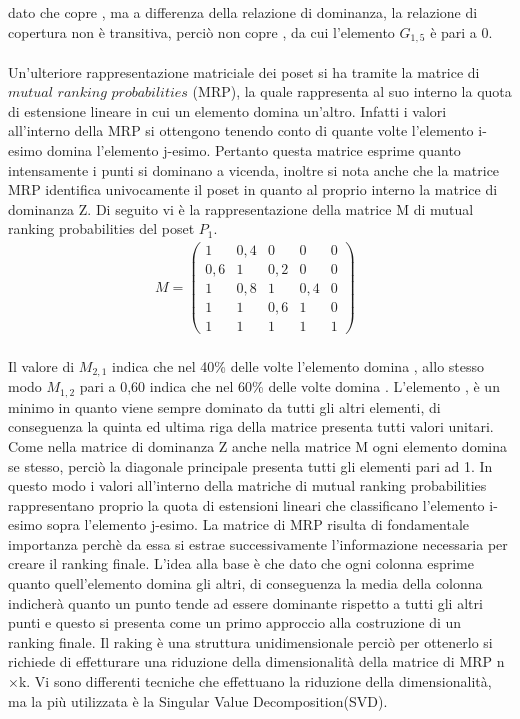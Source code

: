 \documentclass[12pt]{article}
\begin{document}
dato che  copre , ma a differenza della relazione di dominanza, la relazione di copertura non è transitiva, 
perciò  non copre , da cui l'elemento $G_{1,5}$ è pari a 0. \\
\\
Un'ulteriore rappresentazione matriciale dei poset si ha tramite la matrice di $\textit{mutual ranking probabilities}$
(MRP), la quale 
rappresenta al suo interno la quota di estensione lineare in cui un elemento domina un'altro. Infatti i valori all'interno della MRP si ottengono tenendo conto di quante volte l'elemento i-esimo 
domina l'elemento j-esimo. Pertanto
questa matrice esprime quanto intensamente i punti si dominano a vicenda, inoltre si nota anche che la matrice 
MRP identifica univocamente il poset in quanto  al proprio interno la matrice di dominanza 
Z. Di seguito vi è la rappresentazione della matrice M di mutual ranking probabilities
del poset $P_{1}$. 
\begin{align}
    M = 
    \left( \begin{array}{ccccc} 1 & 0,4 & 0 & 0 & 0 \\
        0,6 & 1 & 0,2 & 0 & 0\\
        1 & 0,8 & 1 & 0,4 & 0\\
        1 & 1 & 0,6 & 1 & 0\\
        1 & 1 & 1 & 1 & 1 \end{array} \right)
    \mbox{                  }
\end{align}
\\
Il valore di $M_{2,1}$ indica che nel 40\% delle volte l'elemento  domina , allo stesso 
modo $M_{1,2}$ pari a 0,60 indica che nel 60\% delle volte  domina . L'elemento , è 
un minimo in quanto viene sempre dominato da tutti gli altri elementi, di conseguenza la quinta ed ultima riga della matrice 
presenta tutti valori unitari. Come nella matrice di dominanza Z anche nella matrice M ogni elemento
domina se stesso, perciò la diagonale principale presenta tutti gli elementi pari ad 1. 
In questo modo i valori all'interno della matriche di mutual ranking probabilities rappresentano proprio la quota 
di estensioni lineari che classificano l'elemento i-esimo sopra l'elemento j-esimo. 
La matrice di MRP risulta di fondamentale importanza perchè da essa si estrae successivamente l'informazione
necessaria per creare il ranking finale. L'idea alla base è che dato che ogni colonna esprime quanto 
quell'elemento domina gli altri, di conseguenza la media della colonna indicherà quanto un punto tende ad essere 
dominante rispetto a tutti gli altri punti e questo si presenta come un primo approccio alla costruzione di un ranking
finale. Il raking è una struttura unidimensionale perciò per ottenerlo si richiede di effetturare una 
riduzione della dimensionalità della matrice di MRP n $\times$k. Vi sono differenti tecniche che 
effettuano la riduzione della dimensionalità, ma la più utilizzata è la Singular Value Decomposition(SVD). 
\end{document}
